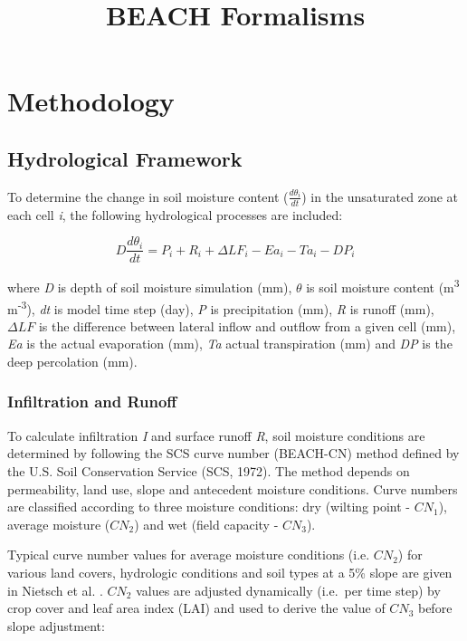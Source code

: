 \documentclass[]{article}
\title{BEACH Formalisms}
\author{}
\date{}
\begin{document}
\maketitle

\section{Methodology}\label{methodology}

\subsection{Hydrological Framework}\label{hydrological-framework}

To determine the change in soil moisture content
(\(\frac{d\theta_i}{dt}\)) in the unsaturated zone at each cell
\emph{i}, the following hydrological processes are included:

\begin{equation}
D\frac{d\theta_i}{dt} = P_i + R_i + \Delta LF_i - Ea_i - Ta_i - DP_i 
\label{eq:hydro} 
\end{equation}

where \emph{D} is depth of soil moisture simulation (mm), \(\theta\) is
soil moisture content (m\textsuperscript{3} m\textsuperscript{-3}),
\emph{dt} is model time step (day), \emph{P} is precipitation (mm),
\emph{R} is runoff (mm), \(\Delta LF\) is the difference between lateral
inflow and outflow from a given cell (mm), \emph{Ea} is the actual
evaporation (mm), \emph{Ta} actual transpiration (mm) and \emph{DP} is
the deep percolation (mm).

\subsubsection{Infiltration and Runoff}\label{infiltration-and-runoff}

To calculate infiltration \emph{I} and surface runoff \emph{R}, soil
moisture conditions are determined by following the SCS curve number
(BEACH-CN) method defined by the U.S. Soil Conservation Service (SCS,
1972). The method depends on permeability, land use, slope and
antecedent moisture conditions. Curve numbers are classified according
to three moisture conditions: dry (wilting point - \(CN_1\)), average
moisture (\(CN_2\)) and wet (field capacity - \(CN_3\)).

Typical curve number values for average moisture conditions (i.e.
\(CN_2\)) for various land covers, hydrologic conditions and soil types
at a 5\% slope are given in Nietsch et al. \citeyearpar{Neitsch2009}.
\(CN_2\) values are adjusted dynamically (i.e.~per time step) by crop
cover and leaf area index (LAI) and used to derive the value of \(CN_3\)
before slope adjustment:
\end{document}
